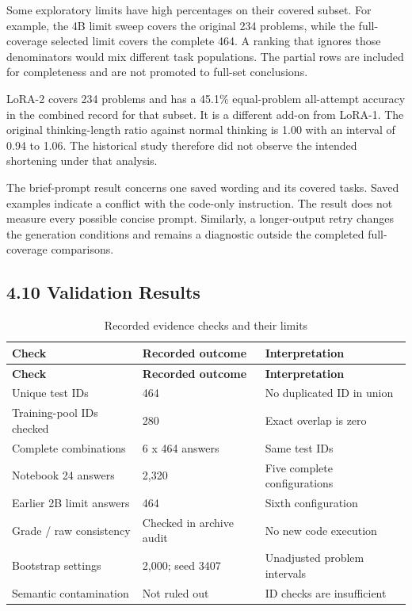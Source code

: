 \documentclass[11pt,letterpaper]{article}
\begin{document}
Some exploratory limits have high percentages on their covered subset. For example, the 4B limit sweep covers the original 234 problems, while the full-coverage selected limit covers the complete 464. A ranking that ignores those denominators would mix different task populations. The partial rows are included for completeness and are not promoted to full-set conclusions.\par

LoRA-2 covers 234 problems and has a 45.1\% equal-problem all-attempt accuracy in the combined record for that subset. It is a different add-on from LoRA-1. The original thinking-length ratio against normal thinking is 1.00 with an interval of 0.94 to 1.06. The historical study therefore did not observe the intended shortening under that analysis.\par

The brief-prompt result concerns one saved wording and its covered tasks. Saved examples indicate a conflict with the code-only instruction. The result does not measure every possible concise prompt. Similarly, a longer-output retry changes the generation conditions and remains a diagnostic outside the completed full-coverage comparisons.\par

\subsection*{4.10 Validation Results}

\begingroup\singlespacing\small\setlength{\tabcolsep}{4pt}
\begin{longtable}{|p{1.997in}|p{1.997in}|p{1.997in}|}
\caption{Recorded evidence checks and their limits}\label{tab:validation}\\
\hline
\textbf{Check} & \textbf{Recorded outcome} & \textbf{Interpretation}\\\hline
\endfirsthead
\hline
\textbf{Check} & \textbf{Recorded outcome} & \textbf{Interpretation}\\\hline
\endhead
Unique test IDs & 464 & No duplicated ID in union\\\hline
Training-pool IDs checked & 280 & Exact overlap is zero\\\hline
Complete combinations & 6 x 464 answers & Same test IDs\\\hline
Notebook 24 answers & 2,320 & Five complete configurations\\\hline
Earlier 2B limit answers & 464 & Sixth configuration\\\hline
Grade / raw consistency & Checked in archive audit & No new code execution\\\hline
Bootstrap settings & 2,000; seed 3407 & Unadjusted problem intervals\\\hline
Semantic contamination & Not ruled out & ID checks are insufficient\\\hline
\end{longtable}
\endgroup
\end{document}
